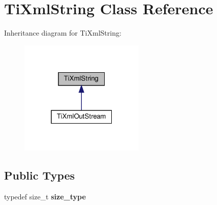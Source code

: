 \hypertarget{classTiXmlString}{}\section{Ti\+Xml\+String Class Reference}
\label{classTiXmlString}


Inheritance diagram for Ti\+Xml\+String\+:
\nopagebreak
\begin{figure}[H]
\begin{center}
\leavevmode
\includegraphics[width=169pt]{classTiXmlString__inherit__graph}
\end{center}
\end{figure}
\subsection*{Public Types}
\begin{DoxyCompactItemize}
\item 
\mbox{\label{classTiXmlString_abeb2c1893a04c17904f7c06546d0b971}} 
typedef size\+\_\+t {\bfseries size\+\_\+type}
\end{DoxyCompactItemize}
